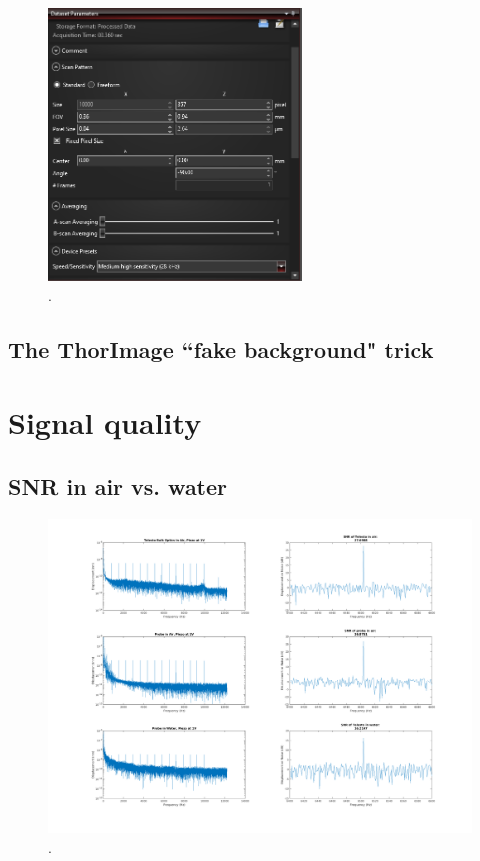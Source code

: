 \documentclass{article}
\begin{document}
\par{}


\begin{figure}[!h]
	\centering
	\includegraphics[width=0.6\textwidth]{Data for Probe Writeup/ThorImage settings for BScan.png}
	\caption{.}
\end{figure}


\subsection{The ThorImage ``fake background" trick}

\par{}

\section{Signal quality}

\par{}

\subsection{SNR in air vs. water}\label{SNRsection}
\hypertarget{SNRsection}{}

\par{}

\begin{figure}[!h]
	\centering
	\includegraphics[width=\textwidth]{Data for Probe Writeup/SNRcomp.png}
	\caption{.}
\end{figure}
\end{document}
